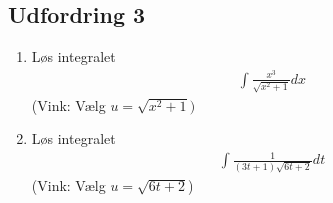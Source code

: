 \subsection*{Udfordring 3}
\begin{enumerate}[label=\roman*)]
	\item Løs integralet
	\begin{align*}
		\int \frac{x^3}{\sqrt{x^2 + 1}} dx
	\end{align*}
	(Vink: Vælg $u = \sqrt{x^2 + 1})$
	\item Løs integralet
	\begin{align*}
		\int \frac{1}{(3t + 1)\sqrt{6t + 2}}dt		
	\end{align*}
	(Vink: Vælg $u = \sqrt{6t+2}$)
\end{enumerate}